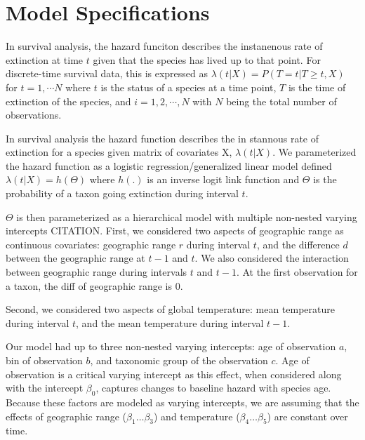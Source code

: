 \documentclass[12pt,letterpaper]{article}
\begin{document}
\section{Model Specifications}

In survival analysis, the hazard funciton describes the instanenous rate of extinction at time \(t\) given that the species has lived up to that point. For discrete-time survival data, this is expressed as \(\lambda(t | X) = P(T = t | T \geq t, X)\) for \(t = 1, \cdots N\) where \(t\) is the status of a species at a time point, \(T\) is the time of extinction of the species, and \(i = 1, 2, \cdots, N\) with \(N\) being the total number of observations. 

In survival analysis the hazard function describes the in stannous rate of extinction for a species given matrix of covariates X, \(\lambda(t | X)\). We parameterized the hazard function as a logistic regression/generalized linear model defined \(\lambda(t | X) = h(\Theta)\) where \(h(.)\) is an inverse logit link function and \(\Theta\) is the probability of a taxon going extinction during interval \(t\). 

\(\Theta\) is then parameterized as a hierarchical model with multiple non-nested varying intercepts CITATION. First, we considered two aspects of geographic range as continuous covariates: geographic range \(r\) during interval \(t\), and the difference \(d\) between the geographic range at \(t - 1\) and \(t\). We also considered the interaction between geographic range during intervals \(t\) and \(t - 1\). At the first observation for a taxon, the diff of geographic range is 0.

Second, we considered two aspects of global temperature: mean temperature during interval \(t\), and the mean temperature during interval \(t - 1\).


Our model had up to three non-nested varying intercepts: age of observation \(a\), bin of observation \(b\), and taxonomic group of the observation \(c\). Age of observation is a critical varying intercept as this effect, when considered along with the intercept \(\beta_{0}\), captures changes to baseline hazard with species age. Because these factors are modeled as varying intercepts, we are assuming that the effects of geographic range (\(\beta_{1} \dots \beta_{3}\)) and temperature (\(\beta_{4} \dots \beta_{5}\)) are constant over time.
\end{document}

